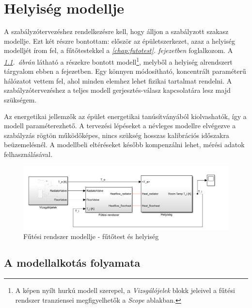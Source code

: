 \chapter{Helyiség modellje}\label{chap:helyiseg}


A szabályzótervezéshez rendelkezésre kell, hogy álljon a szabályzott szakasz modellje. Ezt két részre bontottam: először az épületszerkezet, azaz a helyiség modelljét írom fel, a fűtőtestekkel a \textit{\ref{chap:futotest}. fejezetben} foglalkozom. A \textit{\ref{fig:Simulink-minimalist}.~ábrán} látható a részekre bontott modell\footnote{A képen nyílt hurkú modell szerepel, a \textit{Vizsgálójelek} blokk jeleivel a fűtési rendszer tranziensei megfigyelhetők a \textit{Scope} ablakban.}, melyből a helyiség alrendszert tárgyalom ebben a fejezetben. Egy könnyen módosítható, koncentrált paraméterű hálózatot vettem fel, ahol minden elemhez lehet fizikai tartalmat rendelni. A szabályzótervezéshez a teljes modell gerjesztés-válasz kapcsolatára lesz majd szükségem.

Az energetikai jellemzők az épület energetikai tanúsítványából kiolvashatók, így a modell paraméterezhető. A tervezési lépéseket a névleges modellre elvégezve a szabályzás rögtön működőképes, nincs szükség hosszas kalibrációs időszakra beüzemelésnél. A modellbeli eltéréseket később kompenzálni lehet, mérési adatok felhasználásával.%

\begin{figure}[H]
	\centering
	\includegraphics[trim=0 0 0 0, clip,width=\textwidth]{figures/simulink-network-minimalist-layout3}
	\caption{Fűtési rendszer modellje - fűtőtest és helyiség}
	\label{fig:Simulink-minimalist}
\end{figure}

\section{A modellalkotás folyamata}
%

